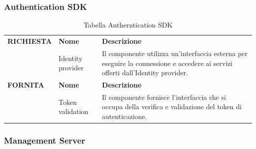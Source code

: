 \documentclass{article}
\begin{document}
\subsubsection{Authentication SDK}

\begin{table}[htbp]
    \centering
    \renewcommand{\arraystretch}{1.3} %
    \begin{tabularx}{\textwidth}{| l | l | X |}
        \Xhline{2pt}
        \textbf{RICHIESTA} & \textbf{Nome} & \textbf{Descrizione} \\
        \Xhline{2pt}
         & Identity provider & Il componente utilizza un'interfaccia esterna per eseguire la connessione e accedere ai servizi offerti dall'Identity provider. \\
        \Xhline{2pt}
        \textbf{FORNITA} & \textbf{Nome} & \textbf{Descrizione} \\
        \Xhline{2pt}
         & Token validation & Il componente fornisce l'interfaccia che si occupa della verifica e validazione del token di autenticazione. \\
        \hline
    \end{tabularx}
    \caption{Tabella Autherntication SDK}
\end{table}

\clearpage

\subsubsection{Management Server}
\end{document}
